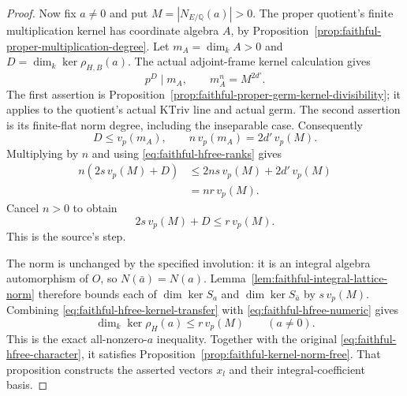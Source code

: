 \begin{proof}
Now fix \(a\ne0\) and put \(M=|N_{E/\mathbb Q}(a)|>0\).
The proper quotient's finite multiplication kernel has
coordinate algebra \(A\), by
Proposition~\ref{prop:faithful-proper-multiplication-degree}.
Let \(m_A=\dim_kA>0\) and
\(D=\dim_k\ker\rho_{H,B}(a)\).
The actual adjoint-frame kernel calculation gives
\[
                p^D\mid m_A,\qquad m_A^n=M^{2d'}.
 \tag{HF4}\label{eq:faithful-hfree-proper-degree}
\]
The first assertion is
Proposition~\ref{prop:faithful-proper-germ-kernel-divisibility};
it applies to the quotient's actual \(\mathrm{KTriv}\) line
and actual germ.  The second assertion is its finite-flat
norm degree, including the inseparable case.
Consequently
\[
                 D\le v_p(m_A),\qquad
                 n\,v_p(m_A)=2d'\,v_p(M).
\]
Multiplying by \(n\) and using
\eqref{eq:faithful-hfree-ranks} gives
\[
 \begin{split}
 n(2s\,v_p(M)+D)
   &\le 2ns\,v_p(M)+2d'\,v_p(M)\\
   &=nr\,v_p(M).
 \end{split}
\]
Cancel \(n>0\) to obtain
\[
                         2s\,v_p(M)+D\le r\,v_p(M).
 \tag{HF5}\label{eq:faithful-hfree-numeric}
\]
This is the source's  step.

The norm is unchanged by the specified involution:
it is an integral algebra automorphism of \(O\), so
\(N(\bar a)=N(a)\).
Lemma~\ref{lem:faithful-integral-lattice-norm} therefore
bounds each of \(\dim\ker S_a\) and
\(\dim\ker S_{\bar a}\) by \(s\,v_p(M)\).
Combining \eqref{eq:faithful-hfree-kernel-transfer} with
\eqref{eq:faithful-hfree-numeric} gives
\[
                 \dim_k\ker\rho_H(a)\le r\,v_p(M)
                            \qquad(a\ne0).
\]
This is the exact all-nonzero-\(a\) inequality.
Together with the original
\eqref{eq:faithful-hfree-character}, it satisfies
Proposition~\ref{prop:faithful-kernel-norm-free}.
That proposition constructs the asserted vectors \(x_l\)
and their integral-coefficient basis.
\end{proof}

